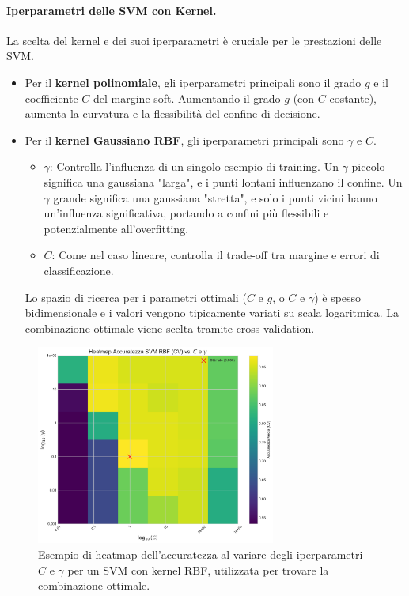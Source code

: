 \documentclass{article}
\begin{document}
\paragraph{Iperparametri delle SVM con Kernel.}
La scelta del kernel e dei suoi iperparametri è cruciale per le prestazioni delle SVM.
\begin{itemize}
    \item Per il \textbf{kernel polinomiale}, gli iperparametri principali sono il grado $g$ e il coefficiente $C$ del margine soft. Aumentando il grado $g$ (con $C$ costante), aumenta la curvatura e la flessibilità del confine di decisione.
    \item Per il \textbf{kernel Gaussiano RBF}, gli iperparametri principali sono $\gamma$ e $C$.
          \begin{itemize}
              \item $\gamma$: Controlla l'influenza di un singolo esempio di training. Un $\gamma$ piccolo significa una gaussiana "larga", e i punti lontani influenzano il confine. Un $\gamma$ grande significa una gaussiana "stretta", e solo i punti vicini hanno un'influenza significativa, portando a confini più flessibili e potenzialmente all'overfitting.
              \item $C$: Come nel caso lineare, controlla il trade-off tra margine e errori di classificazione.
          \end{itemize}
          Lo spazio di ricerca per i parametri ottimali ($C$ e $g$, o $C$ e $\gamma$) è spesso bidimensionale e i valori vengono tipicamente variati su scala logaritmica. La combinazione ottimale viene scelta tramite cross-validation.
\end{itemize}

\begin{figure}[H]
    \centering
    \includegraphics[width=0.7\textwidth]{images/svm_c_gamma_heatmap.pdf}
    \caption{Esempio di heatmap dell'accuratezza al variare degli iperparametri $C$ e $\gamma$ per un SVM con kernel RBF, utilizzata per trovare la combinazione ottimale.}
    \label{fig:svm_c_gamma_heatmap}
\end{figure}
\end{document}
